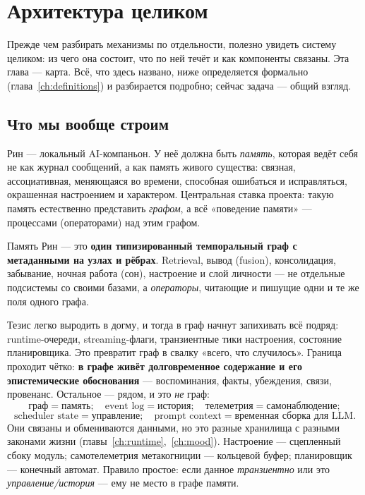 \chapter{Архитектура целиком}
\label{ch:architecture}

Прежде чем разбирать механизмы по отдельности, полезно увидеть систему целиком:
из чего она состоит, что по ней течёт и как компоненты связаны. Эта глава — карта.
Всё, что здесь названо, ниже определяется формально (глава~\ref{ch:definitions}) и
разбирается подробно; сейчас задача — общий взгляд.

\section{Что мы вообще строим}

Рин — локальный AI-компаньон. У неё должна быть \emph{память}, которая ведёт себя не
как журнал сообщений, а как память живого существа: связная, ассоциативная,
меняющаяся во времени, способная ошибаться и исправляться, окрашенная настроением и
характером. Центральная ставка проекта: такую память естественно представить
\emph{графом}, а всё «поведение памяти» — процессами (операторами) над этим графом.

\begin{principle}
Память Рин — это \textbf{один типизированный темпоральный граф с метаданными на
узлах и рёбрах}. Retrieval, вывод (fusion), консолидация, забывание, ночная работа
(сон), настроение и слой личности — не отдельные подсистемы со своими базами, а
\emph{операторы}, читающие и пишущие одни и те же поля одного графа.
\end{principle}

\begin{pitfall}
Тезис легко выродить в догму, и тогда в граф начнут запихивать всё подряд:
runtime-очереди, streaming-флаги, транзиентные тики настроения, состояние
планировщика. Это превратит граф в свалку «всего, что случилось». Граница проходит
чётко: \textbf{в графе живёт долговременное содержание и его эпистемические
обоснования} — воспоминания, факты, убеждения, связи, провенанс. Остальное — рядом,
и это \emph{не} граф:
\[
\text{граф} = \text{память};\quad
\text{event log} = \text{история};\quad
\text{телеметрия} = \text{самонаблюдение};
\]
\[
\text{scheduler state} = \text{управление};\quad
\text{prompt context} = \text{временная сборка для LLM}.
\]
Они связаны и обмениваются данными, но это разные хранилища с разными законами
жизни (главы~\ref{ch:runtime},~\ref{ch:mood}). Настроение — сцепленный сбоку модуль;
самотелеметрия метакогниции — кольцевой буфер; планировщик — конечный автомат.
Правило простое: если данное \emph{транзиентно} или это \emph{управление/история} —
ему не место в графе памяти.
\end{pitfall}

